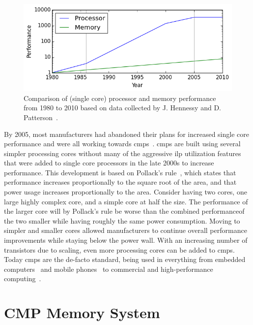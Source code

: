 \begin{figure}[th]
\centering
\includegraphics[width=.8\textwidth]{figures/introduction/memory-gap}
\caption[Processor-Memory Gap]{Comparison of (single core) processor and memory performance from 1980 to 2010 based on data collected by J. Hennessy and D. Patterson~\cite{hennessy2012}.}
\label{fig:introduction:memgap}
\end{figure}

By 2005, most manufacturers had abandoned their plans for increased single core performance and were all working towards \glspl{cmp}~\cite{Sutter2005}.
\glspl{cmp} are built using several simpler processing cores without many of the aggressive \gls{ilp} utilization features that were added to single core processors in the late 2000s to increase performance.
This development is based on Pollack's rule~\cite{Borkar2007}, which states that performance increases proportionally to the square root of the area, and that power usage increases proportionally to the area.
Consider having two cores, one large highly complex core, and a simple core at half the size.
The performance of the larger core will by Pollack's rule be worse than the combined performance\footnotemark of the two smaller while having roughly the same power consumption.
Moving to simpler and smaller cores allowed manufacturers to continue overall performance improvements while staying below the power wall.
With an increasing number of transistors due to scaling, even more processing cores can be added to \glspl{cmp}.
Today \glspl{cmp} are the de-facto standard, being used in everything from embedded computers~\cite{ARM2010} and mobile phones~\cite{Ho2014} to commercial and high-performance computing~\cite{Thomadakis2011, Jain2013}.


\section{CMP Memory System}

